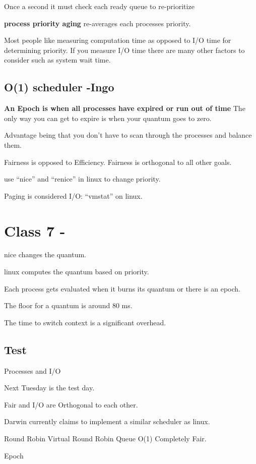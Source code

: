 \documentclass{article}
\begin{document}
Once a second it must check each ready queue to re-prioritize

{\bf process priority aging} re-averages each processes priority.

Most people like measuring computation time as opposed to I/O time for determining priority.
If you measure I/O time there are many other factors to consider such as system wait time.

\subsection*{O(1) scheduler -Ingo}
{\bf An Epoch is when all processes have expired or run out of time}
The only way you can get to expire is when your quantum goes to zero.

Advantage being that you don't have to scan through the processes and balance them. 

Fairness is opposed to Efficiency.
Fairness is orthogonal to all other goals.

use ``nice'' and ``renice'' in linux to change priority.

Paging is considered I/O: ``vmstat'' on linux.

\section{Class 7 - }

nice changes the quantum.

linux computes the quantum based on priority.

Each process gets evaluated when it burns its quantum or there is an epoch.

The floor for a quantum is around 80 ms.

The time to switch context is a significant overhead. 

\subsection{Test}

Processes and I/O

Next Tuesday is the test day.

Fair and I/O are Orthogonal to each other.

Darwin currently claims to implement a similar scheduler as linux.

Round Robin
Virtual Round Robin
Queue
O(1)
Completely Fair.

Epoch
\end{document}

